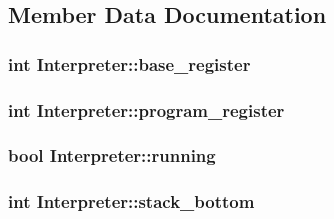 \subsection{Member Data Documentation}
\hypertarget{classInterpreter_a0805dbd4ca54babe4f4b60055f36aa27}{
\subsubsection[{base\_\-register}]{\setlength{\rightskip}{0pt plus 5cm}int {\bf Interpreter::base\_\-register}}}
\label{classInterpreter_a0805dbd4ca54babe4f4b60055f36aa27}
\hypertarget{classInterpreter_a341a6e3cb3a9a23afef084eac5e1ff41}{
\subsubsection[{program\_\-register}]{\setlength{\rightskip}{0pt plus 5cm}int {\bf Interpreter::program\_\-register}}}
\label{classInterpreter_a341a6e3cb3a9a23afef084eac5e1ff41}
\hypertarget{classInterpreter_a26d311ea5a776034720f8ce465f04bc2}{
\subsubsection[{running}]{\setlength{\rightskip}{0pt plus 5cm}bool {\bf Interpreter::running}}}
\label{classInterpreter_a26d311ea5a776034720f8ce465f04bc2}
\hypertarget{classInterpreter_ac2b2272e7e93df082733e94d0c2e39df}{
\subsubsection[{stack\_\-bottom}]{\setlength{\rightskip}{0pt plus 5cm}int {\bf Interpreter::stack\_\-bottom}}}
